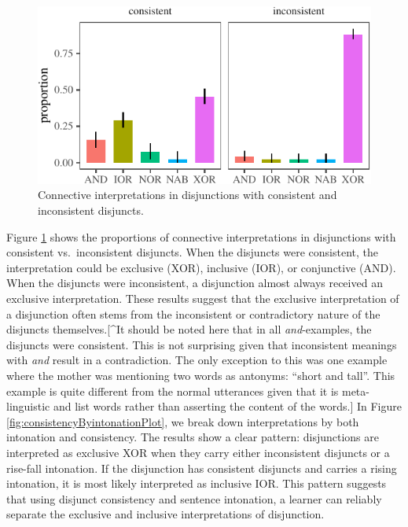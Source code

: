 \documentclass[floatsintext,man]{apa6}
\theoremstyle{definition}
\theoremstyle{definition}
\theoremstyle{definition}
\theoremstyle{remark}
\begin{document}
\begin{figure}[tb]

{\centering \includegraphics{figs/consistencyPlot-1} 

}

\caption{Connective interpretations in disjunctions with consistent and inconsistent disjuncts.}\label{fig:consistencyPlot}
\end{figure}

Figure \ref{fig:consistencyPlot} shows the proportions of connective
interpretations in disjunctions with consistent vs.~inconsistent
disjuncts. When the disjuncts were consistent, the interpretation could
be exclusive (XOR), inclusive (IOR), or conjunctive (AND). When the
disjuncts were inconsistent, a disjunction almost always received an
exclusive interpretation. These results suggest that the exclusive
interpretation of a disjunction often stems from the inconsistent or
contradictory nature of the disjuncts themselves.{[}\^{}It should be
noted here that in all \emph{and}-examples, the disjuncts were
consistent. This is not surprising given that inconsistent meanings with
\emph{and} result in a contradiction. The only exception to this was one
example where the mother was mentioning two words as antonyms:
\enquote{short and tall}. This example is quite different from the
normal utterances given that it is meta-linguistic and list words rather
than asserting the content of the words.{]} In Figure
\ref{fig:consistencyByintonationPlot}, we break down interpretations by
both intonation and consistency. The results show a clear pattern:
disjunctions are interpreted as exclusive XOR when they carry either
inconsistent disjuncts or a rise-fall intonation. If the disjunction has
consistent disjuncts and carries a rising intonation, it is most likely
interpreted as inclusive IOR. This pattern suggests that using disjunct
consistency and sentence intonation, a learner can reliably separate the
exclusive and inclusive interpretations of disjunction.
\end{document}

